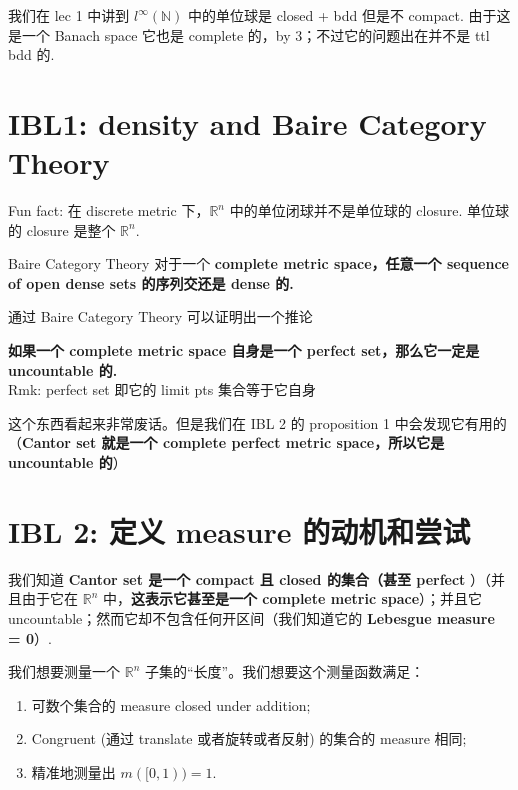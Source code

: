 \documentclass[lang=cn,11pt]{elegantbook}
\begin{document}
\begin{remark}
    我们在 lec 1 中讲到  $l^{\infty}(\mathbb{N})$ 中的单位球是 closed + bdd 但是不 compact. 由于这是一个 Banach space 它也是 complete 的，by 3；不过它的问题出在并不是 ttl bdd 的.
\end{remark}


\section{IBL1: density and Baire Category Theory}

\begin{remark}
    Fun fact: 在 discrete metric 下，$\mathbb{R}^n$ 中的单位闭球并不是单位球的 closure. 单位球的 closure 是整个 $\mathbb{R}^n$.
\end{remark}


\begin{theorem}{Baire Category Theory} \label{Baire Category Theory}
    对于一个\textbf{ complete metric space，任意一个 sequence of open dense sets 的序列交还是 dense 的.}
\end{theorem}

通过 Baire Category Theory 可以证明出一个推论
\begin{corollary}
    \textbf{如果一个 complete metric space 自身是一个 perfect set，那么它一定是 uncountable 的. }
    \\Rmk: perfect set 即它的 limit pts 集合等于它自身
\end{corollary}

   这个东西看起来非常废话。但是我们在 IBL 2 的 proposition 1 中会发现它有用的（\textbf{Cantor set 就是一个 complete perfect metric space，所以它是 uncountable 的}）


\section{IBL 2: 定义 measure 的动机和尝试}

\noindent 我们知道\textbf{ Cantor set 是一个 compact 且 closed 的集合（甚至 perfect }）（并且由于它在  $\mathbb{R}^n$ 中，\textbf{这表示它甚至是一个 complete metric space}）；并且它 uncountable；然而它却不包含任何开区间（我们知道它的 \textbf{Lebesgue measure = 0}）.

\noindent 我们想要测量一个 $\mathbb{R}^n$ 子集的“长度”。我们想要这个测量函数满足：

\begin{enumerate}
    \item  可数个集合的 measure closed under addition;
    \item  Congruent (通过 translate 或者旋转或者反射) 的集合的 measure 相同; 
    \item  精准地测量出 $m([0,1)) = 1$. 
\end{enumerate}
\end{document}
